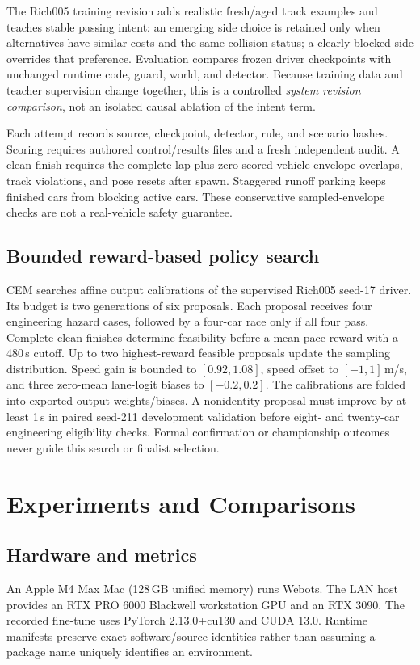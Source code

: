 \documentclass[conference]{IEEEtran}
\begin{document}
The Rich005 training revision adds realistic fresh/aged track examples and teaches stable passing intent: an emerging side choice is retained only when alternatives have similar costs and the same collision status; a clearly blocked side overrides that preference. Evaluation compares frozen driver checkpoints with unchanged runtime code, guard, world, and detector. Because training data and teacher supervision change together, this is a controlled \emph{system revision comparison}, not an isolated causal ablation of the intent term.

Each attempt records source, checkpoint, detector, rule, and scenario hashes. Scoring requires authored control/results files and a fresh independent audit. A clean finish requires the complete lap plus zero scored vehicle-envelope overlaps, track violations, and pose resets after spawn. Staggered runoff parking keeps finished cars from blocking active cars. These conservative sampled-envelope checks are not a real-vehicle safety guarantee.

\subsection{Bounded reward-based policy search}
CEM searches affine output calibrations of the supervised Rich005 seed-17 driver. Its budget is two generations of six proposals. Each proposal receives four engineering hazard cases, followed by a four-car race only if all four pass. Complete clean finishes determine feasibility before a mean-pace reward with a 480\,s cutoff. Up to two highest-reward feasible proposals update the sampling distribution. Speed gain is bounded to $[0.92,1.08]$, speed offset to $[-1,1]$\,m/s, and three zero-mean lane-logit biases to $[-0.2,0.2]$. The calibrations are folded into exported output weights/biases. A nonidentity proposal must improve by at least 1\,s in paired seed-211 development validation before eight- and twenty-car engineering eligibility checks. Formal confirmation or championship outcomes never guide this search or finalist selection.

\section{Experiments and Comparisons}
\subsection{Hardware and metrics}
An Apple M4 Max Mac (128\,GB unified memory) runs Webots. The LAN host provides an RTX PRO 6000 Blackwell workstation GPU and an RTX 3090. The recorded fine-tune uses PyTorch 2.13.0+cu130 and CUDA 13.0. Runtime manifests preserve exact software/source identities rather than assuming a package name uniquely identifies an environment.
\end{document}
